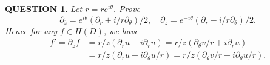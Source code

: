 \documentclass[12pt]{article}
\renewcommand{\(}{\left(}%
\renewcommand{\)}{\right)}%
\renewcommand{\[}{\left[}%
\renewcommand{\]}{\right]}%
\newtheorem{question}{QUESTION}[section]}
\begin{document}
 \begin{question}
 	Let $r=re^{i\theta}$. Prove
 	\begin{equation*}
 		\partial_{\overline{z}}=e^{i\theta}(\partial_r+i/r\partial_\theta)/2,\quad \partial_z=e^{-i\theta}(\partial_r-i/r\partial_\theta)/2.
 	\end{equation*}
 	Hence for any $f\in H(D)$, we have 
 	\begin{equation*}
 		\begin{split}
 			f'=\partial_z f&= r/z(\partial_ru+i\partial_ru)=r/z(\partial_\theta v/r+i\partial_ru)\\
 			&=r/z(\partial_ru-i\partial_\theta u/r)=r/z(\partial_\theta v/r-i\partial_\theta u/r).
 		\end{split}
 	\end{equation*}
 \end{question}
\end{document}
